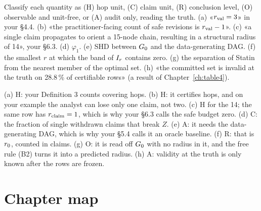 \begin{exercicio}[metodo=classification,conceito=unidade-afirmacao]
Classify each quantity as (H) hop unit, (C) claim unit, (R) conclusion level, (O) observable and
unit-free, or (A) audit only, reading the truth. (a) «$r_{\mathrm{val}} = 3$» in your \S4.4. (b) «the practitioner-facing count of safe revisions is
$r_{\mathrm{val}} - 1$». (c) «a single claim propagates to orient a 15-node chain, resulting in a structural radius of
14», your \S6.3. (d) $\varphi_1$. (e) SHD between $G_0$ and the data-generating DAG. (f) the smallest $r$ at
which the band of $I_{r}$ contains zero. (g) the separation of Statin from the nearest member of the
optimal set. (h) «the committed set is invalid at the truth on 28.8\,\% of certifiable rows» (a result of Chapter~\ref{ch:table4}).
\end{exercicio}
\begin{solucao}
(a) H: your Definition 3 counts covering hops. (b) H: it certifies hops, and on your example the analyst
can lose only one claim, not two. (c) H for the 14; the same row has $r_{\mathrm{claim}} = 1$, which is why your
\S6.3 calls the safe budget zero. (d) C: the fraction of single withdrawn claims that break $Z$. (e) A: it
needs the data-generating DAG, which is why your \S5.4 calls it an oracle baseline. (f) R: that is $r_{0}$,
counted in claims. (g) O: it is read off $G_0$ with no radius in it, and the free rule (B2) turns it into a predicted
radius.
(h) A: validity at the truth is only known after the rows are frozen.
\end{solucao}

\section*{Chapter map}
\begin{center}
\end{center}
